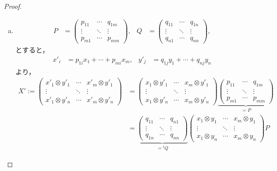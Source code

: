 \documentclass[uplatex, dvipdfmx]{jsreport}
\begin{document}
\begin{proof}\mbox{}
    \begin{enumerate}[(a)]
        \item \begin{align*}
            P&=\begin{pmatrix}p_{11}&\cdots&q_{1m}\\\vdots&\ddots&\vdots\\p_{m1}&\cdots&p_{mm}\end{pmatrix},&Q&=\begin{pmatrix}q_{11}&\cdots&q_{1n}\\\vdots&\ddots&\vdots\\q_{n1}&\cdots&q_{nn}\end{pmatrix},
        \end{align*}
        とすると，
        \begin{align*}
            x'_i&=p_{1i}x_1+\cdots+p_{mi}x_m,&y'_j&=q_{1j}y_1+\cdots+q_{nj}y_n
        \end{align*}
        より，
        \begin{align*}
            X':=\begin{pmatrix}x'_1\otimes y'_1&\cdots&x'_m\otimes y'_1\\\vdots&\ddots&\vdots\\x'_1\otimes y'_n&\cdots&x'_m\otimes y'_n\end{pmatrix}&=\begin{pmatrix}x_1\otimes y'_1&\cdots&x_m\otimes y'_1\\\vdots&\ddots&\vdots\\x_1\otimes y'_n&\cdots&x_m\otimes y'_n\end{pmatrix}\underbrace{\begin{pmatrix}p_{11}&\cdots&q_{1m}\\\vdots&\ddots&\vdots\\p_{m1}&\cdots&p_{mm}\end{pmatrix}}_{=P}\\
            &=\underbrace{\begin{pmatrix}q_{11}&\cdots&q_{n1}\\\vdots&\ddots&\vdots\\q_{1n}&\cdots&q_{nn}\end{pmatrix}}_{={}^t\!Q}\begin{pmatrix}x_1\otimes y_1&\cdots&x_m\otimes y_1\\\vdots&\ddots&\vdots\\x_1\otimes y_n&\cdots&x_m\otimes y_n\end{pmatrix}P

\end{align*}
\end{enumerate}
\end{proof}
\end{document}
